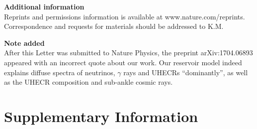 \documentclass[aps,prd,onecolumn,superscriptaddress,11pt]{revtex4}
\begin{document}
{\bf Additional information}\\
Reprints and permissions information is available at www.nature.com/reprints. Correspondence and requests for materials should be addressed to K.M.

{\bf Note added}\\
After this Letter was submitted to Nature Physics, the preprint arXiv:1704.06893 appeared with an incorrect quote about our work. Our reservoir model indeed explains diffuse spectra of neutrinos, $\gamma$ rays and UHECRs ``dominantly'', as well as the UHECR composition and sub-ankle cosmic rays. 




%


\clearpage

\setcounter{equation}{0}
\setcounter{figure}{0}
\setcounter{table}{0}
\setcounter{section}{0}
\setcounter{page}{1}
\makeatletter
\renewcommand{\theequation}{S\arabic{equation}}
\renewcommand{\thefigure}{S\arabic{figure}}
\renewcommand{\thetable}{S\arabic{table}}
\newcommand\ptwiddle[1]{\mathord{\mathop{#1}\limits^{\scriptscriptstyle(\sim)}}}

\appendix

\section*{\Large Supplementary Information}
\end{document}
